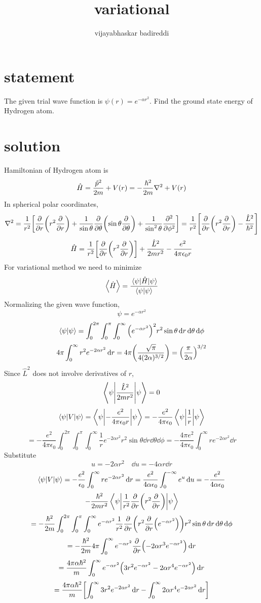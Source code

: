 \documentclass[12pt]{article}
\title{variational}
\author{vijayabhaskar badireddi}
\begin{document}
\section*{statement}
The given trial wave function is $\psi(r)=e^{-\alpha r^2}$. Find the ground state energy of Hydrogen atom.
\section*{solution}
Hamiltonian of Hydrogen atom is \[\hat{H}=\frac{\hat{p}^2}{2m}+V(r)=-\frac{\hbar^2}{2m}\laplacian+V(r)\]
In spherical polar coordinates, 
\[\laplacian=\frac{1}{r^2}\qty[\pdv{r}\qty(r^2\pdv{r})+\frac{1}{\sin\theta}\pdv{\theta}\qty(\sin\theta\pdv{\theta})+\frac{1}{\sin^2\theta}\pdv[2]{\phi}]=\frac{1}{r^2}\qty[\pdv{r}\qty(r^2\pdv{r})-\frac{\hat{L}^2}{\hbar^2}]\]
\[\hat{H}=\frac{1}{r^2}\qty[\pdv{r}\qty(r^2\pdv{r})]+\frac{\hat{L}^2}{2mr^2}-\frac{e^2}{4\pi\epsilon_0 r}\]
For variational method we need to minimize \[\ev{\hat{H}}=\frac{\mel{\psi}{\hat{H}}{\psi}}{\braket{\psi}{\psi}}\]
Normalizing the given wave function,
\[\psi=e^{-\alpha r^2}\]
\[\braket{\psi}{\psi}=\int_0^{2\pi}\int_0^{\pi}\int_0^{\infty}\qty(e^{-\alpha r^2})^2r^2\sin\theta\dd{r}\dd{\theta}\dd{\phi}\]
\[4\pi \int_0^{\infty}r^2e^{-2\alpha r^2}\dd{r}=4\pi \qty(\frac{\sqrt{\pi}}{4(2\alpha)^{3/2}})=\qty(\frac{\pi}{2\alpha})^{3/2}\]
Since $\hat{L}^2$ does not involve derivatives of $r$,
\[\mel**{\psi}{\frac{\hat{L}^2}{2mr^2}}{\psi}=0\]
\[\mel**{\psi}{V}{\psi}=\mel**{\psi}{-\frac{e^2}{4\pi\epsilon_0 r}}{\psi}=-\frac{e^2}{4\pi\epsilon_0 }\mel**{\psi}{\frac{1}{ r}}{\psi}\]
\[=-\frac{e^2}{4\pi\epsilon_0 }\int_0^{2\pi}\int_0^{\pi}\int_0^{\infty}\frac{1}{r}e^{-2\alpha r^2}r^2\sin\theta\dd{r}\dd{\theta}\dd{\phi}=-\frac{4\pi e^2}{4\pi\epsilon_0 }\int_0^{\infty}re^{-2\alpha r^2}\dd{r}\]
Substitute \[u=-2\alpha r^2\quad \dd{u}=-4\alpha r \dd{r}\]
\[\mel**{\psi}{V}{\psi}=-\frac{e^2}{\epsilon_0 }\int_0^{\infty}re^{-2\alpha r^2}\dd{r}=\frac{e^2}{4\alpha\epsilon_0 }\int_0^{-\infty}e^{u}\dd{u}=-\frac{e^2}{4\alpha\epsilon_0}\]
\newpage
\[-\frac{\hbar^2}{2mr^2}\mel**{\psi}{\frac{1}{r^2}\pdv{r}\qty(r^2\pdv{r})}{\psi}\]
\[=-\frac{\hbar^2}{2m}\int_0^{2\pi}\int_0^{\pi}\int_0^{\infty}e^{-\alpha r^2}\frac{1}{r^2}\pdv{r}\qty(r^2\pdv{r}\qty(e^{-\alpha r^2}))r^2\sin\theta\dd{r}\dd{\theta}\dd{\phi}\]
\[=-\frac{\hbar^2}{2m}4\pi\int_0^{\infty}e^{-\alpha r^2}\pdv{r}\qty(-2\alpha r^3e^{-\alpha r^2})\dd{r}\]
\[=\frac{4\pi\alpha\hbar^2}{m}\int_0^{\infty}e^{-\alpha r^2}\qty(3r^2e^{-\alpha r^2} -2\alpha r^4e^{-\alpha r^2})\dd{r}\]
\[=\frac{4\pi\alpha\hbar^2}{m}\qty[\int_0^{\infty}3r^2e^{-2\alpha r^2}\dd{r}-\int_0^{\infty}2\alpha r^4e^{-2\alpha r^2}\dd{r}]\]
\end{document}
